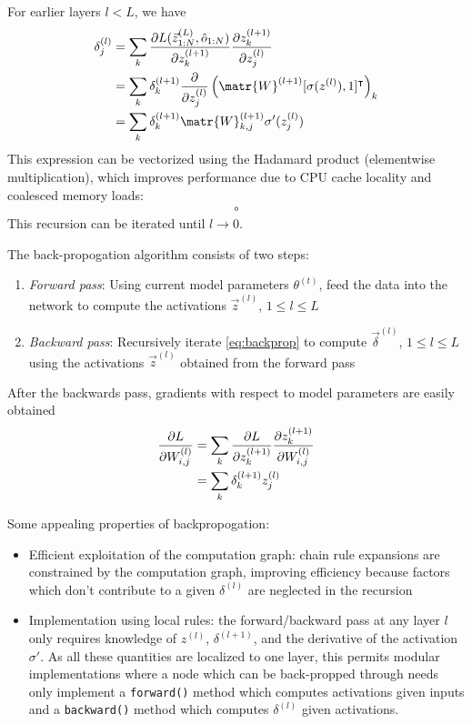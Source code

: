 For earlier layers $l < L$, we have
\begin{align}
    \delta^{(l)}_{j}
    &= \sum_k \frac{\pd L(\vec{z}^{(L)}_{1:N}, \hat{o}_{1:N})}{\pd z^{(l+1)}_k}
    \frac{\pd z^{(l+1)}_k}{\pd z^{(l)}_j}\\
    &= \sum_k \delta^{(l+1)}_k
    \frac{\pd}{\pd z^{(l)}_j} \left( \matr{W}^{(l+1)} [\sigma(z^{(l)}), 1]^\tp \right)_k \\
    &= \sum_k \delta^{(l+1)}_k
    \matr{W}^{(l+1)}_{k,j} \sigma'(z^{(l)}_j) \label{eq:backprop}
\end{align}
This expression can be vectorized using the Hadamard product (elementwise multiplication), which
improves performance due to CPU cache locality and coalesced memory loads: 
\begin{align}
    \circ
\end{align}
This recursion can be iterated until $l \to 0$.

The back-propogation algorithm consists of two steps:
\begin{enumerate}
    \item \emph{Forward pass}: Using current model parameters $\theta^{(t)}$,
        feed the data into the network to compute the activations $\vec{z}^{(l)}$,
        $1 \leq l \leq L$
    \item \emph{Backward pass}: Recursively iterate \autoref{eq:backprop}
        to compute $\vec{\delta}^{(l)}$, $1 \leq l \leq L$ using the activations
        $\vec{z}^{(l)}$ obtained from the forward pass
\end{enumerate}

After the backwards pass, gradients with respect to model parameters are easily obtained
\begin{align}
    \frac{\partial L}{\partial W^{(l)}_{i,j} }
    &= \sum_k \frac{\partial L}{\partial z^{(l+1)}_k} \frac{\partial z^{(l+1)}_k}{\partial W^{(l)}_{i,j}} \\
    &= \sum_k \delta^{(l+1)}_k z^{(l)}_j\\
\end{align}

Some appealing properties of backpropogation:
\begin{itemize}
    \item Efficient exploitation of the computation graph: chain rule expansions
        are constrained by the computation graph, improving efficiency
        because factors which don't contribute to a given $\delta^{(l)}$
        are neglected in the recursion
    \item Implementation using local rules: the forward/backward pass
        at any layer $l$ only requires knowledge of $z^{(l)}$, $\delta^{(l+1)}$,
        and the derivative of the activation $\sigma'$. As all these quantities are localized
        to one layer, this permits modular implementations where a node which can be back-propped
        through needs only implement a \texttt{forward()} method which computes activations
        given inputs and a \texttt{backward()} method which computes $\delta^{(l)}$ given
        activations.
\end{itemize}


